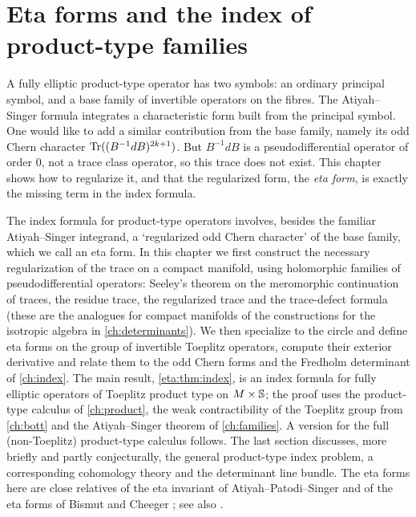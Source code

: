 \chapter{Eta forms and the index of product-type families}\label{ch:eta}
\providecommand{\Ch}{\operatorname{Ch}}
\providecommand{\Chodd}{\operatorname{Ch}_{\mathrm{odd}}}
\providecommand{\Td}{\operatorname{Td}}
\providecommand{\Trbar}{\overline{\operatorname{Tr}}}
\providecommand{\TrR}{\operatorname{Tr}_{\mathrm{R}}}
\providecommand{\res}{\operatorname{res}}
\providecommand{\FP}{\operatorname{FP}}
\providecommand{\wind}{\operatorname{wind}}
\providecommand{\HardyL}{\mathcal{H}}
\providecommand{\GTeta}{G_{\mathcal{T}}}
\providecommand{\PsiT}[1]{\Psi^{#1}_{\mathcal{T}}}
\providecommand{\Psipteta}[1]{\Psi^{#1}_{\mathrm{pt}}}
\providecommand{\PsiptT}[1]{\Psi^{#1}_{\mathrm{pt},\mathcal{T}}}

A fully elliptic product-type operator has two symbols: an ordinary principal
symbol, and a base family of invertible operators on the fibres. The
Atiyah--Singer formula integrates a characteristic form built from the principal
symbol. One would like to add a similar contribution from the base family, namely
its odd Chern character $\operatorname{Tr}((B^{-1}dB)^{2k+1})$. But $B^{-1}dB$ is a
pseudodifferential operator of order $0$, not a trace class operator, so this
trace does not exist. This chapter shows how to regularize it, and that the
regularized form, the \emph{eta form}, is exactly the missing term in the index
formula.

The index formula for product-type operators involves, besides the familiar
Atiyah--Singer integrand, a `regularized odd Chern character' of the base family,
which we call an eta form. In this chapter we first construct the necessary
regularization of the trace on a compact manifold, using holomorphic families of
pseudodifferential operators: Seeley's theorem on the meromorphic continuation of
traces, the residue trace, the regularized trace and the trace-defect formula (these
are the analogues for compact manifolds of the constructions for the isotropic
algebra in \cref{ch:determinants}). We then specialize to the circle and define eta
forms on the group of invertible Toeplitz operators, compute their exterior
derivative and relate them to the odd Chern forms and the Fredholm determinant of
\cref{ch:index}. The main result, \cref{eta:thm:index}, is an index formula for
fully elliptic operators of Toeplitz product type on $M\times\mathbb{S}$; the proof
uses the product-type calculus of \cref{ch:product}, the weak contractibility of the
Toeplitz group from \cref{ch:bott} and the Atiyah--Singer theorem of
\cref{ch:families}. A version for the full (non-Toeplitz) product-type calculus
follows. The last section discusses, more briefly and partly conjecturally, the
general product-type index problem, a corresponding cohomology theory and the
determinant line bundle. The eta forms here are close relatives of the eta
invariant of Atiyah--Patodi--Singer \cite{Melrose-APS} and of the eta forms of
Bismut and Cheeger \cite{Bismut-Cheeger}; see also \cite{Melrose-Rochon}.

